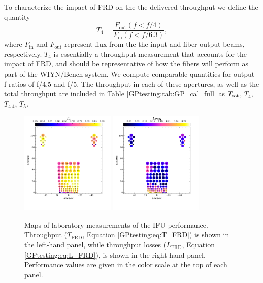 To characterize the impact of FRD on the the delivered throughput we
define the quantity
\begin{equation}
\label{GPtesting:eq:T_FRD}
  T_{\mathrm{4}} = \frac{F_{\mathrm{out}}(f<f/4)}{F_{\mathrm{in}}(f<f/6.3)},
\end{equation}
where $F_\mathrm{in}$ and $F_\mathrm{out}$ represent flux from the the
input and fiber output beams, respectively. $T_4$ is essentially a
throughput measurement that accounts for the impact of FRD, and should
be representative of how the fibers will perform as part of the
WIYN/Bench system.  We compute comparable quantities for output
f-ratios of f/4.5 and f/5.  The throughput in each of these apertures,
as well as the total throughput are included in Table
\ref{GPtesting:tab:GP_cal_full} as $T_{\rm tot}$, $T_4$, $T_{4.4}$,
$T_{5}$.

\begin{figure}[htb]
  \centering
  \includegraphics[width=0.4\textwidth]{Appendix/figs/gradpak_map.pdf}
  \includegraphics[width=0.4\textwidth]{Appendix/figs/gradpak_L_map.pdf}
\vskip -0.25in
\caption[\GP throughput and and FRD
losses]{\label{GPtesting:fig:TL_FRD}\fixspacing Maps of laboratory
  measurements of the \GP IFU performance. Throughput
  ($T_{\mathrm{FRD}}$, Equation \ref{GPtesting:eq:T_FRD}) is shown in
  the left-hand panel, while throughput losses ($L_{\mathrm{FRD}}$,
  Equation \ref{GPtesting:eq:L_FRD}), is shown in the right-hand
  panel. Performance values are given in the color scale at the top of
  each panel.}
\end{figure}

